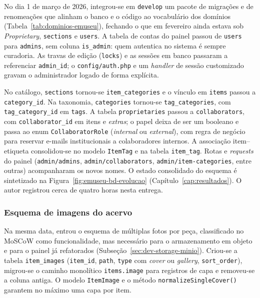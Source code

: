 No dia 1 de março de 2026, integrou-se em \texttt{develop} um pacote de migrações e de renomeações que alinham o banco e o código ao vocabulário dos domínios (Tabela~\ref{tab:dominios-emuseu}), fechando o que em fevereiro ainda estava sob \textit{Proprietary}, \texttt{sections} e \texttt{users}. A tabela de contas do painel passou de \texttt{users} para \texttt{admins}, sem coluna \texttt{is\_admin}: quem autentica no sistema é sempre curadoria. As travas de edição (\texttt{locks}) e as sessões em banco passaram a referenciar \texttt{admin\_id}; o \texttt{config/auth.php} e um \textit{handler} de sessão customizado gravam o administrador logado de forma explícita.

No catálogo, \texttt{sections} tornou-se \texttt{item\_categories} e o vínculo em \texttt{items} passou a \texttt{category\_id}. Na taxonomia, \texttt{categories} tornou-se \texttt{tag\_categories}, com \texttt{tag\_category\_id} em \texttt{tags}. A tabela \texttt{proprietaries} passou a \texttt{collaborators}, com \texttt{collaborator\_id} em itens e \textit{extras}; o papel deixa de ser um booleano e passa ao enum \texttt{CollaboratorRole} (\textit{internal} ou \textit{external}), com regra de negócio para reservar e-mails institucionais a colaboradores internos. A associação item--etiqueta consolidou-se no modelo \texttt{ItemTag} e na tabela \texttt{item\_tag}. Rotas e \textit{requests} do painel (\texttt{admin/admins}, \texttt{admin/collaborators}, \texttt{admin/item-categories}, entre outras) acompanharam os novos nomes. O estado consolidado do esquema é sintetizado na Figura~\ref{fig:emuseu-bd-evolucao} (Capítulo~\ref{cap:resultados}). O autor registrou cerca de quatro horas nesta entrega.


\subsubsection{Esquema de imagens do acervo}\label{sec:dev-refatoracao-item-images}

Na mesma data, entrou o esquema de múltiplas fotos por peça, classificado no MoSCoW como funcionalidade, mas necessário para o armazenamento em objeto e para o painel já refatorados (Subseção~\ref{sec:dev-storage-minio}). Criou-se a tabela \texttt{item\_images} (\texttt{item\_id}, \texttt{path}, \texttt{type} com \textit{cover} ou \textit{gallery}, \texttt{sort\_order}), migrou-se o caminho monolítico \texttt{items.image} para registros de capa e removeu-se a coluna antiga. O modelo \texttt{ItemImage} e o método \texttt{normalizeSingleCover()} garantem no máximo uma capa por item.


